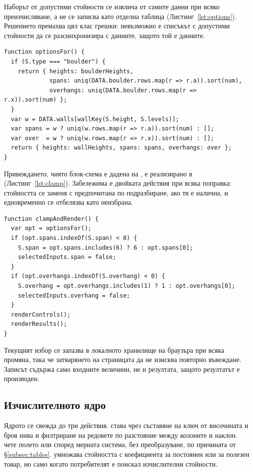 Наборът от допустими стойности се извлича от самите данни при всяко преизчисляване, а
не се записва като отделна таблица (Листинг~\ref{lst:options}). Решението премахва
цял клас грешки: невъзможно е списъкът с допустими стойности да се разсинхронизира с
данните, защото той \emph{е} данните.
\\\newpage
\begin{lstlisting}[caption={Допустимите стойности се извличат от самите данни},label={lst:options}]
function optionsFor() {
  if (S.type === "boulder") {
    return { heights: boulderHeights,
             spans: uniq(DATA.boulder.rows.map(r => r.a)).sort(num),
             overhangs: uniq(DATA.boulder.rows.map(r => r.x)).sort(num) };
  }
  var w = DATA.walls[wallKey(S.height, S.levels)];
  var spans = w ? uniq(w.rows.map(r => r.a)).sort(num) : [];
  var over  = w ? uniq(w.rows.map(r => r.x)).sort(num) : [];
  return { heights: wallHeights, spans: spans, overhangs: over };
}
\end{lstlisting}

Привеждането, чиято блок-схема е дадена на , е реализирано в
 (Листинг~\ref{lst:clamp}). Забележима е двойката действия при
всяка поправка: стойността се заменя с предпочитана по подразбиране, ако тя е налична,
и едновременно се отбелязва като неизбрана.

\begin{lstlisting}[caption={Привеждане на избора към допустима комбинация},label={lst:clamp}]
function clampAndRender() {
  var opt = optionsFor();
  if (opt.spans.indexOf(S.span) < 0) {
    S.span = opt.spans.includes(6) ? 6 : opt.spans[0];
    selectedInputs.span = false;
  }
  if (opt.overhangs.indexOf(S.overhang) < 0) {
    S.overhang = opt.overhangs.includes(1) ? 1 : opt.overhangs[0];
    selectedInputs.overhang = false;
  }
  renderControls();
  renderResults();
}
\end{lstlisting}

Текущият избор се запазва в локалното хранилище на браузъра при всяка промяна, така
че затварянето на страницата да не изисква повторно въвеждане. Записът съдържа само
входните величини, не и резултата, защото резултатът е производен.

\subsection{Изчислителното ядро}
\label{subsec:coreimpl}

Ядрото се свежда до три действия.  става чрез съставяне на ключ
от височината и броя нива и филтриране на редовете по разстояние между колоните и
наклон.  чете полето  или  според мерната
система, без преобразуване, по причината от §\ref{subsec:tables}.  умножава стойността с коефициента за постоянен или за полезен
товар, но само когато потребителят е поискал изчислителни стойности.


